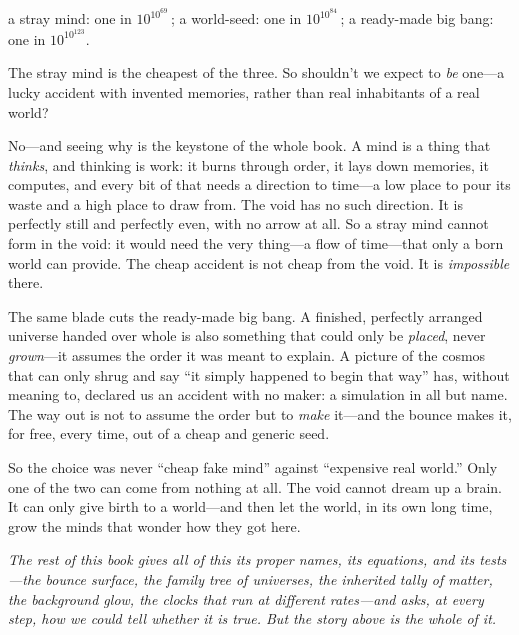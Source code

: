 \begin{center}
a stray mind: one in $10^{10^{69}}$\,;\qquad
a world-seed: one in $10^{10^{84}}$\,;\qquad
a ready-made big bang: one in $10^{10^{123}}$.
\end{center}

\noindent The stray mind is the cheapest of the three. So shouldn't we expect to
\emph{be} one---a lucky accident with invented memories, rather than real
inhabitants of a real world?

No---and seeing why is the keystone of the whole book. A mind is a thing that
\emph{thinks}, and thinking is work: it burns through order, it lays down
memories, it computes, and every bit of that needs a direction to time---a low
place to pour its waste and a high place to draw from. The void has no such
direction. It is perfectly still and perfectly even, with no arrow at all. So a
stray mind cannot form in the void: it would need the very thing---a flow of
time---that only a born world can provide. The cheap accident is not cheap from
the void. It is \emph{impossible} there.

The same blade cuts the ready-made big bang. A finished, perfectly arranged
universe handed over whole is also something that could only be \emph{placed},
never \emph{grown}---it assumes the order it was meant to explain. A picture of the
cosmos that can only shrug and say ``it simply happened to begin that way'' has,
without meaning to, declared us an accident with no maker: a simulation in all but
name. The way out is not to assume the order but to \emph{make} it---and the
bounce makes it, for free, every time, out of a cheap and generic seed.

So the choice was never ``cheap fake mind'' against ``expensive real world.'' Only
one of the two can come from nothing at all. The void cannot dream up a brain. It
can only give birth to a world---and then let the world, in its own long time,
grow the minds that wonder how they got here.

\bigskip
\noindent\emph{The rest of this book gives all of this its proper names, its
equations, and its tests---the bounce surface, the family tree of universes, the
inherited tally of matter, the background glow, the clocks that run at different
rates---and asks, at every step, how we could tell whether it is true. But the
story above is the whole of it.}
